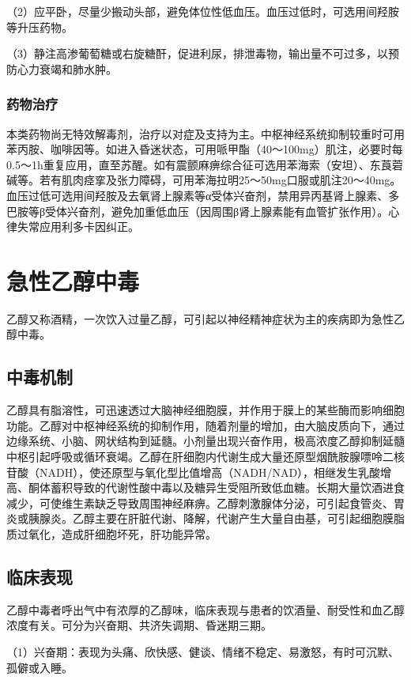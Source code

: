 （2）应平卧，尽量少搬动头部，避免体位性低血压。血压过低时，可选用间羟胺等升压药物。

（3）静注高渗葡萄糖或右旋糖酐，促进利尿，排泄毒物，输出量不可过多，以预防心力衰竭和肺水肿。

\subsubsection{药物治疗}

本类药物尚无特效解毒剂，治疗以对症及支持为主。中枢神经系统抑制较重时可用苯丙胺、咖啡因等。如进入昏迷状态，可用哌甲酯（40～100mg）肌注，必要时每0.5～1h重复应用，直至苏醒。如有震颤麻痹综合征可选用苯海索（安坦）、东莨菪碱等。若有肌肉痉挛及张力障碍，可用苯海拉明25～50mg口服或肌注20～40mg。血压过低可选用间羟胺及去氧肾上腺素等α受体兴奋剂，禁用异丙基肾上腺素、多巴胺等β受体兴奋剂，避免加重低血压（因周围β肾上腺素能有血管扩张作用）。心律失常应用利多卡因纠正。

\section{急性乙醇中毒}

乙醇又称酒精，一次饮入过量乙醇，可引起以神经精神症状为主的疾病即为急性乙醇中毒。

\subsection{中毒机制}

乙醇具有脂溶性，可迅速透过大脑神经细胞膜，并作用于膜上的某些酶而影响细胞功能。乙醇对中枢神经系统的抑制作用，随着剂量的增加，由大脑皮质向下，通过边缘系统、小脑、网状结构到延髓。小剂量出现兴奋作用，极高浓度乙醇抑制延髓中枢引起呼吸或循环衰竭。乙醇在肝细胞内代谢生成大量还原型烟酰胺腺嘌呤二核苷酸（NADH），使还原型与氧化型比值增高（NADH/NAD），相继发生乳酸增高、酮体蓄积导致的代谢性酸中毒以及糖异生受阻所致低血糖。长期大量饮酒进食减少，可使维生素缺乏导致周围神经麻痹。乙醇刺激腺体分泌，可引起食管炎、胃炎或胰腺炎。乙醇主要在肝脏代谢、降解，代谢产生大量自由基，可引起细胞膜脂质过氧化，造成肝细胞坏死，肝功能异常。

\subsection{临床表现}

乙醇中毒者呼出气中有浓厚的乙醇味，临床表现与患者的饮酒量、耐受性和血乙醇浓度有关。可分为兴奋期、共济失调期、昏迷期三期。

（1）兴奋期：表现为头痛、欣快感、健谈、情绪不稳定、易激怒，有时可沉默、孤僻或入睡。

